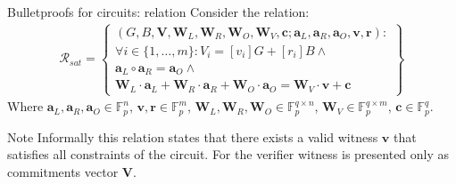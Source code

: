 \documentclass{zkdl-presentation-template}
\begin{document}
    \begin{frame}{Bulletproofs for circuits: relation}
        Consider the relation:
        \begin{equation*}
            \begin{aligned}
                \mathcal{R}_{sat} = \left\{
                    \begin{array}{l}
                        (G, B, \mathbf{V}, \mathbf{W}_L, \mathbf{W}_R, \mathbf{W}_O, \mathbf{W}_V, \mathbf{c}; \mathbf{a}_L, \mathbf{a}_R, \mathbf{a}_O, \mathbf{v}, \mathbf{r}) : \\
                        \forall i \in \{1,\dots,m\}: V_i = [v_i]G + [r_i]B \wedge \\
                        \mathbf{a}_L \circ \mathbf{a}_R = \mathbf{a}_O \wedge \\
                        \mathbf{W}_L \cdot \mathbf{a}_L + \mathbf{W}_R \cdot \mathbf{a}_R + \mathbf{W}_O \cdot \mathbf{a}_O = \mathbf{W}_V \cdot \mathbf{v} + \mathbf{c}
                \end{array}\right\}
            \end{aligned}
        \end{equation*}
        Where $\mathbf{a}_L, \mathbf{a}_R, \mathbf{a}_O \in \mathbb{F}_p^n$, $\mathbf{v}, \mathbf{r} \in \mathbb{F}_p^m$, $\mathbf{W}_L, \mathbf{W}_R, \mathbf{W}_O \in \mathbb{F}_p^{q \times n}$, $\mathbf{W}_V \in \mathbb{F}_p^{q \times m}$, $\mathbf{c} \in \mathbb{F}_p^q$.
        \pause
        \begin{remarkblock}{Note}
            Informally this relation states that there exists a valid witness $\mathbf{v}$ that satisfies all constraints of the circuit. For the verifier witness is presented only as commitments vector $\mathbf{V}$.
        \end{remarkblock}
    \end{frame}
\end{document}

